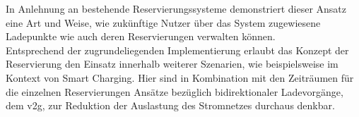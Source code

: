 In Anlehnung an bestehende Reservierungssysteme demonstriert dieser Ansatz eine Art und Weise, wie zuk\"unftige Nutzer \"uber das System zugewiesene Ladepunkte wie auch deren Reservierungen verwalten k\"onnen.\\
Entsprechend der zugrundeliegenden Implementierung erlaubt das Konzept der Reservierung den Einsatz innerhalb weiterer Szenarien, wie beispielsweise im Kontext von Smart Charging. Hier sind in Kombination mit den Zeitr\"aumen für die einzelnen Reservierungen Ans\"atze bez\"uglich bidirektionaler Ladevorg\"ange, dem \acrfull{v2g}, zur Reduktion der Auslastung des Stromnetzes durchaus denkbar.
